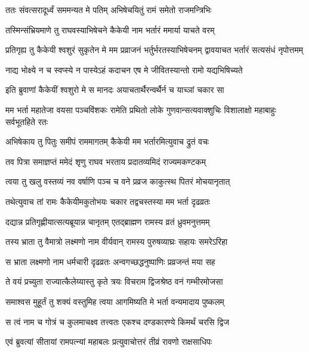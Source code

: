 \twolineshloka
{ततः संवत्सरादूर्ध्वं सममन्यत मे पतिम्}
{अभिषेचयितुं रामं समेतो राजमन्त्रिभिः} %

\twolineshloka
{तस्मिन्संभ्रियमाणे तु राघवस्याभिषेचने}
{कैकेयी नाम भर्तारं ममार्या याचते वरम्} %

\threelineshloka
{प्रतिगृह्य तु कैकेयी श्वशुरं सुकृतेन मे}
{मम प्रव्राजनं भर्तुर्भरतस्याभिषेचनम्}
{द्वावयाचत भर्तारं सत्यसंधं नृपोत्तमम्} %

\twolineshloka
{नाद्य भोक्ष्ये न च स्वप्स्ये न पास्येऽहं कदाचन}
{एष मे जीवितस्यान्तो रामो यद्यभिषिच्यते} %

\twolineshloka
{इति ब्रुवाणां कैकेयीं श्वशुरो मे स मानदः}
{अयाचतार्थैरन्वर्थैर्न च याच्ञां चकार सा} %

\threelineshloka
{मम भर्ता महातेजा वयसा पञ्चविंशकः}
{रामेति प्रथितो लोके गुणवान्सत्यवाक्शुचिः}
{विशालाक्षो महाबाहुः सर्वभूतहिते रतः} %

\twolineshloka
{अभिषेकाय तु पितुः समीपं राममागतम्}
{कैकेयी मम भर्तारमित्युवाच द्रुतं वचः} %

\twolineshloka
{तव पित्रा समाज्ञप्तं ममेदं शृणु राघव}
{भरताय प्रदातव्यमिदं राज्यमकण्टकम्} %

\twolineshloka
{त्वया तु खलु वस्तव्यं नव वर्षाणि पञ्च च}
{वने प्रव्रज काकुत्स्थ पितरं मोचयानृतात्} %

\twolineshloka
{तथेत्युवाच तां रामः कैकेयीमकुतोभयः}
{चकार तद्वचस्तस्या मम भर्ता दृढव्रतः} %

\twolineshloka
{दद्यान्न प्रतिगृह्णीयात्सत्यब्रूयान्न चानृतम्}
{एतद्ब्राह्मण रामस्य व्रतं ध्रुवमनुत्तमम्} %

\twolineshloka
{तस्य भ्राता तु वैमात्रो लक्ष्मणो नाम वीर्यवान्}
{रामस्य पुरुषव्याघ्रः सहायः समरेऽरिहा} %

\twolineshloka
{स भ्राता लक्ष्मणो नाम धर्मचारी दृढव्रतः}
{अन्वगच्छद्धनुष्पाणिः प्रव्रजन्तं मया सह} %

\twolineshloka
{ते वयं प्रच्युता राज्यात्कैलेय्यास्तु कृते त्रयः}
{विचराम द्विजश्रेष्ठ वनं गम्भीरमोजसा} %

\twolineshloka
{समाश्वस मुहूर्तं तु शक्यं वस्तुमिह त्वया}
{आगमिष्यति मे भर्ता वन्यमादाय पुष्कलम्} %

\twolineshloka
{स त्वं नाम च गोत्रं च कुलमाचक्ष्व तत्त्वतः}
{एकश्च दण्डकारण्ये किमर्थं चरसि द्विज} %

\twolineshloka
{एवं ब्रुवत्यां सीतायां रामपत्न्यां महाबलः}
{प्रत्युवाचोत्तरं तीव्रं रावणो राक्षसाधिपः} %

